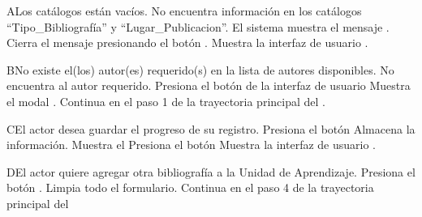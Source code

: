 
\begin{UCtrayectoriaA}{A}{Los catálogos están vacíos.}
    \UCpaso No encuentra información en los catálogos ``Tipo\_Bibliografía'' y ``Lugar\_Publicacion''.
    \UCpaso El sistema muestra el mensaje .
    \UCpaso[\UCactor] Cierra el mensaje presionando el botón .
    \UCpaso Muestra la interfaz de usuario .
\end{UCtrayectoriaA}


\begin{UCtrayectoriaA}{B}{No existe el(los) autor(es) requerido(s) en la lista de autores disponibles.}
    \UCpaso[\UCactor] No encuentra al autor requerido.
    \UCpaso[\UCactor] Presiona el botón  de la interfaz de usuario 
    \UCpaso Muestra el modal .
    \UCpaso Continua en el paso 1 de la trayectoria principal del .
\end{UCtrayectoriaA}


\begin{UCtrayectoriaA}{C}{El actor desea guardar el progreso de su registro.}
    \UCpaso[\UCactor] Presiona el botón 
    \UCpaso Almacena la información.
    \UCpaso Muestra el 
    \UCpaso[\UCactor] Presiona el botón  
    \UCpaso Muestra la interfaz de usuario .
\end{UCtrayectoriaA}


\begin{UCtrayectoriaA}{D}{El actor quiere agregar otra bibliografía a la Unidad de Aprendizaje.}
    \UCpaso[\UCactor] Presiona el botón .
    \UCpaso Limpia todo el formulario.
    \UCpaso Continua en el paso 4 de la trayectoria principal del 
\end{UCtrayectoriaA}



